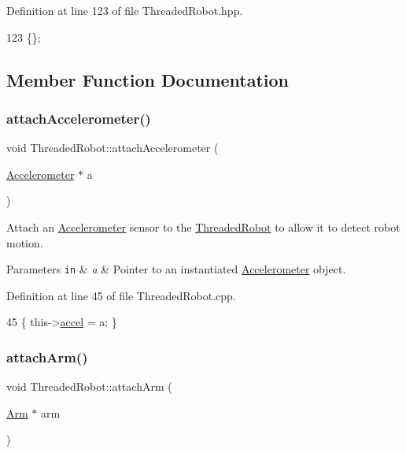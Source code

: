 Definition at line 123 of file Threaded\+Robot.\+hpp.


\begin{DoxyCode}
123 \{\};
\end{DoxyCode}


\subsection{Member Function Documentation}
\mbox{\label{class_threaded_robot_a5c9752f8b7d97689f8b5f1c4bf87ad2d}} 
\subsubsection{\texorpdfstring{attach\+Accelerometer()}{attachAccelerometer()}}
{\footnotesize\ttfamily void Threaded\+Robot\+::attach\+Accelerometer (\begin{DoxyParamCaption}\item[{\hyperlink{class_accelerometer}{Accelerometer} $\ast$}]{a }\end{DoxyParamCaption})}



Attach an \hyperlink{class_accelerometer}{Accelerometer} sensor to the \hyperlink{class_threaded_robot}{Threaded\+Robot} to allow it to detect robot motion. 


\begin{DoxyParams}[1]{Parameters}
\mbox{\tt in}  & {\em a} & Pointer to an instantiated \hyperlink{class_accelerometer}{Accelerometer} object. \\
\hline
\end{DoxyParams}


Definition at line 45 of file Threaded\+Robot.\+cpp.


\begin{DoxyCode}
45 \{ this->\hyperlink{class_threaded_robot_ae12c29cb9719f6562f27402f487321e6}{accel} = a; \}
\end{DoxyCode}
\mbox{\label{class_threaded_robot_ab6b42cc3e28dad7823f35afea5ceb4cc}} 
\subsubsection{\texorpdfstring{attach\+Arm()}{attachArm()}}
{\footnotesize\ttfamily void Threaded\+Robot\+::attach\+Arm (\begin{DoxyParamCaption}\item[{\hyperlink{class_arm}{Arm} $\ast$}]{arm }\end{DoxyParamCaption})}



